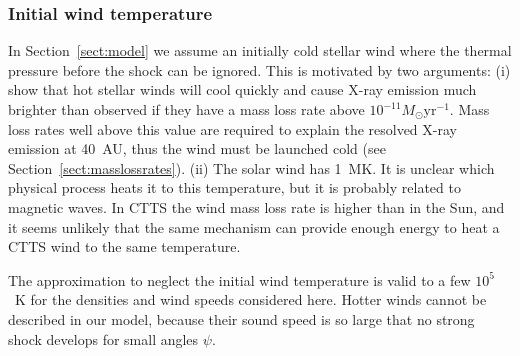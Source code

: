 \subsubsection{Initial wind temperature}
\label{sect:T_0}
In Section~\ref{sect:model} we assume an initially cold stellar wind where the thermal pressure before the shock can be ignored. This is motivated by two arguments: (i) \citet{2007IAUS..243..299M} show that hot stellar winds will cool quickly and cause X-ray emission much brighter than observed if they have a mass loss rate above $10^{-11}M_\odot\mathrm{ yr}^{-1}$.  Mass loss rates well above this value are required to explain the resolved X-ray emission at 40~AU, thus the wind must be launched cold (see Section~\ref{sect:masslossrates}). (ii) The solar wind has 1~MK. It is unclear which physical process heats it to this temperature, but it is probably related to magnetic waves. In CTTS the wind mass loss rate is higher than in the Sun, and it seems unlikely that the same mechanism can provide enough energy to heat a CTTS wind to the same temperature.

The approximation to neglect the initial wind temperature is valid to a few $10^5$~K for the densities and wind speeds considered here. Hotter winds cannot be described in our model, because their sound speed is so large that no strong shock develops for small angles $\psi$.